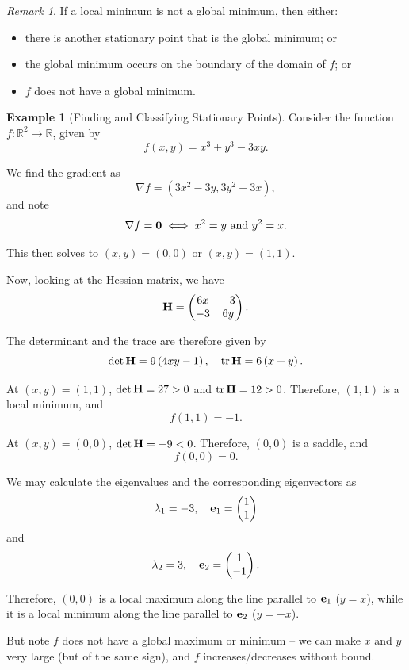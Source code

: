 \documentclass[11pt]{article}
\numberwithin{equation}{section}
\theoremstyle{definition}
\newtheorem{example}[theorem]{Example}
\theoremstyle{remark}
\newtheorem{remark}[theorem]{Remark}
\newcommand{\pqty}[1]{\left(#1\right)}
\newcommand{\functiondomain}[3]{#1:#2\to #3}
\newcommand{\RR}{\mathbb{R}}
\newcommand{\grad}{\nabla}
\DeclareMathOperator{\tr}{tr}
\begin{document}
\begin{remark}\label{variation-unit-0006}
    If a local minimum is not a global minimum, then either:
    \begin{itemize}
        \item there is another stationary point that is the global minimum; or
        \item the global minimum occurs on the boundary of the domain of \(f\); or
        \item \(f\) does not have a global minimum.
    \end{itemize}
\end{remark}

\begin{example}[Finding and Classifying Stationary Points]\label{variation-unit-0007}
    \label{ex:finding-classifying-stationary-points}%
    Consider the function \(\functiondomain{f}{\RR^2}{\RR}\), given by
    \[
        f\pqty{x, y} = x^3 + y^3 - 3xy.
    \]

    We find the gradient as
    \[
        \grad f = \pqty{3 x^2 - 3y, 3 y^2 - 3x},
    \]
    and note
    \[
        \grad f = \vb{0} \iff x^2 = y \text{ and } y^2 = x.
    \]

    This then solves to \(\pqty{x, y} = \pqty{0, 0}\) or \(\pqty{x, y} = \pqty{1, 1}\).

    Now, looking at the Hessian matrix, we have
    \[
        \vb{H} = \begin{pmatrix}
            6x & -3 \\ -3 & 6y
        \end{pmatrix}.
    \]

    The determinant and the trace are therefore given by
    \[
        \det \vb{H} = 9 \pqty{4xy - 1}, \quad \tr \vb{H} = 6 \pqty{x + y}.
    \]

    At \(\pqty{x, y} = \pqty{1, 1}\), \(\det \vb{H} = 27 > 0\) and \(\tr \vb{H} = 12 > 0\). Therefore, \(\pqty{1, 1}\) is a local minimum, and
    \[
        f\pqty{1, 1} = -1.
    \]

    At \(\pqty{x, y} = \pqty{0, 0}\), \(\det \vb{H} = -9 < 0\). Therefore, \(\pqty{0, 0}\) is a saddle, and
    \[
        f\pqty{0, 0} = 0.
    \]

    We may calculate the eigenvalues and the corresponding eigenvectors as
    \[
        \lambda_1 = -3, \quad \vb{e}_1 = \begin{pmatrix}
            1 \\ 1
        \end{pmatrix}
    \]
    and
    \[
        \lambda_2 = 3, \quad \vb{e}_2 = \begin{pmatrix}
            1 \\ -1
        \end{pmatrix}.
    \]

    Therefore, \(\pqty{0, 0}\) is a local maximum along the line parallel to \(\vb{e}_1\) (\(y = x\)), while it is a local minimum along the line parallel to \(\vb{e}_2\) (\(y = -x\)).

    But note \(f\) does not have a global maximum or minimum -- we can make \(x\) and \(y\) very large (but of the same sign), and \(f\) increases/decreases without bound.
\end{example}
\end{document}

